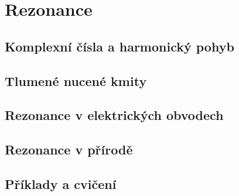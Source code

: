 \chapter{Rezonance}\label{fyz:IchapXXIII}
\minitoc
  \section{Komplexní čísla a harmonický pohyb}\label{fyz:IchapXXIIIsecI}
  \section{Tlumené nucené kmity}\label{fyz:IchapXXIIIsecII}
  \section{Rezonance v elektrických obvodech}\label{fyz:IchapXXIIIsecIII}
  \section{Rezonance v přírodě}\label{fyz:IchapXXIIIsecIV}
  \section{Příklady a cvičení}\label{fyz:IchapXXIIIsecV}